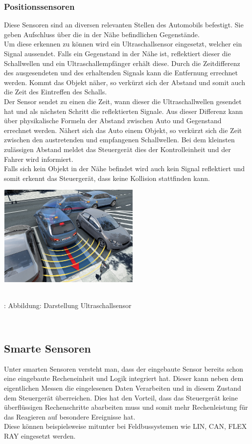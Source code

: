 \documentclass{article}
\begin{document}
				\subsubsection{Positionssensoren}
					Diese Sensoren sind an diversen relevanten Stellen des Automobils befestigt. Sie geben Aufschluss über die in der Nähe befindlichen Gegenstände.\\
					Um diese erkennen zu können wird ein Ultraschallsensor eingesetzt, welcher ein Signal aussendet. Falls ein Gegenstand in der Nähe ist, reflektiert dieser die Schallwellen und ein Ultraschallempfänger erhält diese. Durch die Zeitdifferenz des ausgesendeten und des erhaltenden Signals kann die Entfernung errechnet werden. Kommt das Objekt näher, so verkürzt sich der Abstand und somit auch die Zeit des Eintreffen des Schalls.\\
					Der Sensor sendet zu einen die Zeit, wann dieser die Ultraschallwellen gesendet hat und als nächsten Schritt die reflektierten Signale. Aus dieser Differenz kann über physikalische Formeln der Abstand zwischen Auto und Gegenstand errechnet werden. Nähert sich das Auto einem Objekt, so verkürzt sich die Zeit zwischen den austretenden und empfangenen Schallwellen. Bei dem kleinsten zulässigen Abstand meldet das Steuergerät dies der Kontrolleinheit und der Fahrer wird informiert.\\
					Falls sich kein Objekt in der Nähe befindet wird auch kein Signal reflektiert und somit erkennt das Steuergerät, dass keine Kollision stattfinden kann.
				
					\begin{center}
						\includegraphics[width=7cm, height=5cm] {Images/Kapitel5/ultraschall.png}
						\caption {\\\cite{TS33}: Abbildung: Darstellung Ultraschallsensor}
					\end{center}\\
					
				
				
		\subsection{Smarte Sensoren} 
			Unter smarten Sensoren versteht man, dass der eingebaute Sensor bereits schon eine eingebaute Recheneinheit und Logik integriert hat. Dieser kann neben dem eigentlichen Messen die eingelesenen Daten Verarbeiten und in diesem Zustand dem Steuergerät überreichen. Dies hat den Vorteil, dass das Steuergerät keine überflüssigen Rechenschritte abarbeiten muss und somit mehr Rechenleistung für das Reagieren auf besondere Ereignisse hat.\\
			Diese können beispielsweise mitunter bei Feldbussystemen wie LIN, CAN, FLEX RAY eingesetzt werden.		
		
\end{document}
